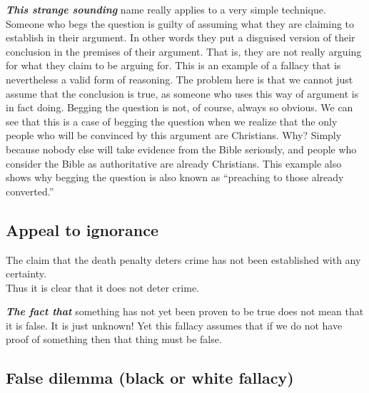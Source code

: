 \documentclass[
  12pt, openany]{book}
\theoremstyle{definition}
\theoremstyle{definition}
\theoremstyle{definition}
\theoremstyle{remark}
\begin{document}
\textbf{\emph{This strange sounding}} name really applies to a very simple technique. Someone who begs the question is guilty of assuming what they are claiming to establish in their argument. In other words they put a disguised version of their conclusion in the premises of their argument. That is, they are not really arguing for what they claim to be arguing for. This is an example of a fallacy that is nevertheless a valid form of reasoning. The problem here is that we cannot just assume that the conclusion is true, as someone who uses this way of argument is in fact doing. Begging the question is not, of course, always so obvious. We can see that this is a case of begging the question when we realize that the only people who will be convinced by this argument are Christians. Why? Simply because nobody else will take evidence from the Bible seriously, and people who consider the Bible as authoritative are already Christians. This example also shows why begging the question is also known as ``preaching to those already converted.''

\hypertarget{appeal-to-ignorance}{%
\subsection*{Appeal to ignorance}\label{appeal-to-ignorance}}


\begin{center}

\begin{argument}

The claim that the death penalty deters crime has not been established with any certainty.\\
Thus it is clear that it does not deter crime.

\end{argument}

\end{center}

\textbf{\emph{The fact that}} something has not yet been proven to be true does not mean that it is false. It is just unknown! Yet this fallacy assumes that if we do not have proof of something then that thing must be false.

\hypertarget{false-dilemma-black-or-white-fallacy}{%
\subsection*{False dilemma (black or white fallacy)}\label{false-dilemma-black-or-white-fallacy}}
\end{document}
